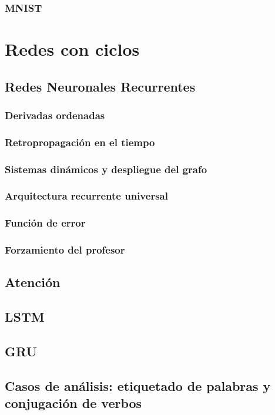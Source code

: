\documentclass[12pt,openany]{book}
\begin{document}
\section{MNIST}

\part{Redes con ciclos}
\chapter{Redes Neuronales Recurrentes}
\section{Derivadas ordenadas}
\section{Retropropagación en el tiempo}
\section{Sistemas dinámicos y despliegue del grafo}
\section{Arquitectura recurrente universal}
\section{Función de error}
\section{Forzamiento del profesor}

\chapter{Atención}
\chapter{LSTM}
\chapter{GRU}
\chapter{Casos de análisis: etiquetado de palabras y conjugación de verbos}
\end{document}
